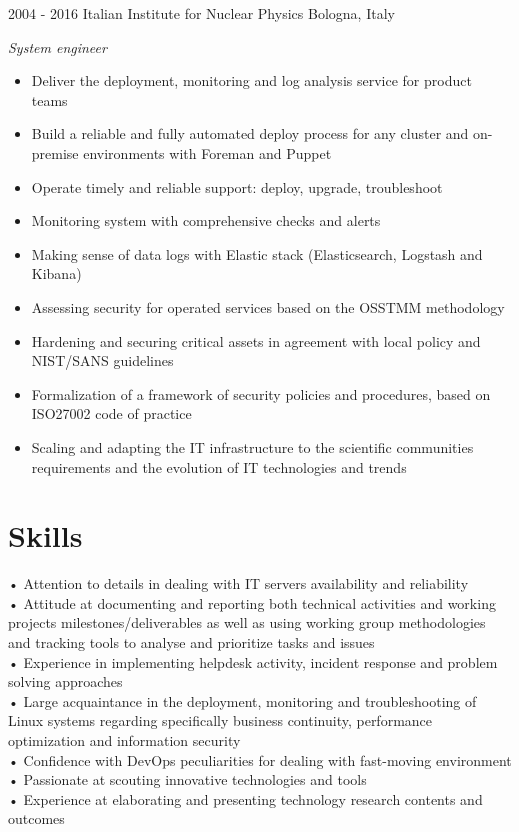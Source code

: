 \documentclass[]{friggeri-cv} %
\begin{document}
\begin{entrylist}
\entry
{2004 - 2016}
{Italian Institute for Nuclear Physics}
{Bologna, Italy}
{\emph{System engineer}
\begin{itemize}
\item {Deliver the deployment, monitoring and log analysis service for product teams}
\item {Build a reliable and fully automated deploy process for any cluster and on-premise environments with Foreman and Puppet}
\item {Operate timely and reliable support: deploy, upgrade, troubleshoot}
\item {Monitoring system with comprehensive checks and alerts}
\item {Making sense of data logs with Elastic stack (Elasticsearch, Logstash and Kibana)}
\item {Assessing security for operated services based on the OSSTMM methodology}
\item {Hardening and securing critical assets in agreement with local policy and NIST/SANS guidelines}
\item {Formalization of a framework of security policies and procedures, based on ISO27002 code of practice}
\item {Scaling and adapting the IT infrastructure to the scientific communities requirements and the evolution of IT technologies and trends}
\end{itemize}}
\end{entrylist}

\section{Skills}
\textbf{} • Attention to details in dealing with IT servers availability and reliability\\
\textbf{} • Attitude at documenting and reporting both technical activities and working projects milestones/deliverables as well as using working group methodologies and tracking tools to analyse and prioritize tasks and issues\\
\textbf{} • Experience in implementing helpdesk activity, incident response and problem solving approaches\\
\textbf{} • Large acquaintance in the deployment, monitoring and troubleshooting of Linux systems regarding specifically business continuity, performance optimization and information security\\
\textbf{} • Confidence with DevOps peculiarities for dealing with fast-moving environment\\
\textbf{} • Passionate at scouting innovative technologies and tools\\
\textbf{} • Experience at elaborating and presenting technology research contents and outcomes\\
\end{document}
